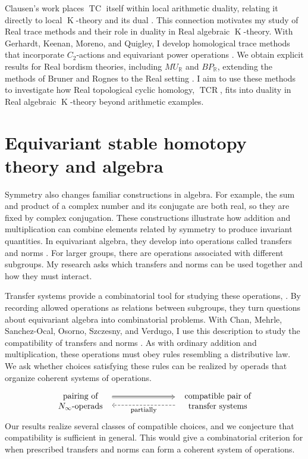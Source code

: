 \documentclass[10pt]{article}
\newcommand{\K}{\operatorname{K}}
\begin{document}
Clausen's work places $\operatorname{TC}$ itself within local arithmetic duality, relating it directly to local $\K$-theory and its dual \cite{Clausen17}.
This connection motivates my study of Real trace methods and their role in duality in Real algebraic $\K$-theory.
With Gerhardt, Keenan, Moreno, and Quigley, I develop homological trace methods that incorporate $C_2$-actions and equivariant power operations \cite{CGKMQ}.
We obtain explicit results for Real bordism theories, including $MU_{\mathbb R}$ and $BP_{\mathbb R}$, extending the methods of Bruner and Rognes to the Real setting \cite{MR2153113}.
I aim to use these methods to investigate how Real topological cyclic homology, $\operatorname{TCR}$, fits into duality in Real algebraic $\K$-theory beyond arithmetic examples. 

\section*{Equivariant stable homotopy theory and algebra}
Symmetry also changes familiar constructions in algebra.
For example, the sum and product of a complex number and its conjugate are both real, so they are fixed by complex conjugation.
These constructions illustrate how addition and multiplication can combine elements related by symmetry to produce invariant quantities.
In equivariant algebra, they develop into operations called transfers and norms \cite{MR3773736}.
For larger groups, there are operations associated with different subgroups.
My research asks which transfers and norms can be used together and how they must interact.

Transfer systems provide a combinatorial tool for studying these operations, \cite{MR4244201}.
By recording allowed operations as relations between subgroups, they turn questions about equivariant algebra into combinatorial problems.
With Chan, Mehrle, Sanchez-Ocal, Osorno, Szczesny, and Verdugo, I use this description to study the compatibility of transfers and norms \cite{CCM+}.
As with ordinary addition and multiplication, these operations must obey rules resembling a distributive law.
We ask whether choices satisfying these rules can be realized by operads that organize coherent systems of operations.
\[
\begin{tikzcd}[column sep=8em]
\begin{array}{c}
\text{pairing of}\\
N_\infty\text{-operads}
\end{array}
\arrow[r, Rightarrow, shift left=1.3ex, shorten <=2pt, shorten >=2pt]
&
\begin{array}{c}
\text{compatible pair of}\\
\text{transfer systems}
\end{array}
\arrow[l, dashed, shift left=1ex,
       shorten <=2pt, shorten >=2pt,
       "\text{\footnotesize partially}"]
\end{tikzcd}
\]
Our results realize several classes of compatible choices, and we conjecture that compatibility is sufficient in general.
This would give a combinatorial criterion for when prescribed transfers and norms can form a coherent system of operations.
\end{document}
